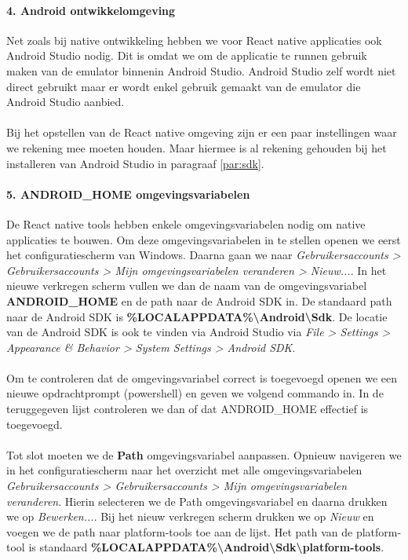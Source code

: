 \paragraph{4. Android ontwikkelomgeving}
Net zoals bij native ontwikkeling hebben we voor React native applicaties ook Android Studio nodig. 
Dit is omdat we om de applicatie te runnen gebruik maken van de emulator binnenin Android Studio. 
Android Studio zelf wordt niet direct gebruikt maar er wordt enkel gebruik gemaakt van de 
emulator die Android Studio aanbied.
\\\\
Bij het opstellen van de React native omgeving zijn er een paar instellingen waar we rekening 
mee moeten houden. Maar hiermee is al rekening gehouden bij het installeren van Android Studio 
in paragraaf \ref{par:sdk}.

\paragraph{5. ANDROID\_HOME omgevingsvariabelen}
De React native tools hebben enkele omgevingsvariabelen nodig om native applicaties te bouwen. 
Om deze omgevingsvariabelen in te stellen openen we eerst het configuratiescherm van Windows. 
Daarna gaan we naar 
\textit{Gebruikersaccounts > Gebruikersaccounts > Mijn omgevingsvariabelen veranderen > Nieuw...}. 
In het nieuwe verkregen scherm vullen we dan de naam van de omgevingsvariabel \textbf{ANDROID\_HOME} 
en de path naar de Android SDK in. De standaard path naar de Android SDK is 
\textbf{\%LOCALAPPDATA\%\backslash Android\backslash Sdk}. 
De locatie van de Android SDK is ook te vinden via Android Studio via 
\textit{File > Settings > Appearance \& Behavior > System Settings > Android SDK}.
\\\\
Om te controleren dat de omgevingsvariabel correct is toegevoegd openen we een nieuwe 
opdrachtprompt (powershell) en geven we volgend commando in.
In de teruggegeven lijst controleren we dan of dat ANDROID\_HOME effectief is toegevoegd.
\\\\
Tot slot moeten we de \textbf{Path} omgevingsvariabel aanpassen. 
Opnieuw navigeren we in het configuratiescherm naar het overzicht met alle omgevingsvariabelen 
\textit{Gebruikersaccounts > Gebruikersaccounts > Mijn omgevingsvariabelen veranderen}. 
Hierin selecteren we de Path omgevingsvariabel en daarna drukken we op \textit{Bewerken...}. 
Bij het nieuw verkregen scherm drukken we op \textit{Nieuw} en voegen we de path naar platform-tools 
toe aan de lijst. Het path van de platform-tool is standaard 
\textbf{\%LOCALAPPDATA\%\backslash Android\backslash Sdk\backslash platform-tools}.

